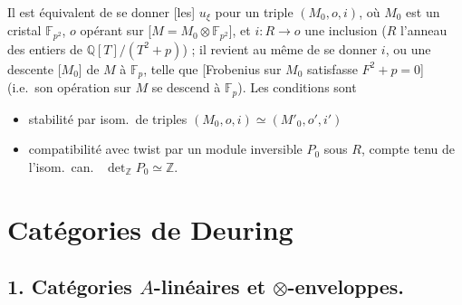 \documentclass[11pt,a4paper]{article}
\begin{document}
Il est équivalent de se donner [les] $u_{\xi}$ pour un triple
$(M_{0}, o, i)$, où  $M_{0}$ est un cristal
 $\mathbb{F}_{p^{2}}$, $o$  opérant sur
[$M = M_{0} \otimes \mathbb{F}_{p^{2}}$], et $i : R \to o$ une inclusion
($R$ l'anneau des entiers de $\mathbb{Q}[T]/(T^{2} + p)$) ; il revient au
même de se donner $i$, ou une descente [$M_{0}$] de $M$ à $\mathbb{F}_{p}$,
telle que [Frobenius sur $M_{0}$ satisfasse $F^{2} + p = 0$]
 (i.e.\ son opération sur $M$ se
descend à $\mathbb{F}_{p}$). Les conditions sont
\begin{itemize}
  \item[(i)] stabilité par isom.\ de triples
  $(M_{0}, o, i) \simeq (M'_{0}, o', i')$
  \item[(ii)]  compatibilité avec twist par un module
  inversible $P_{0}$ sous $R$, compte tenu de l'isom.\ can.~
  $\det_{\mathbb{Z}} P_{0} \simeq \mathbb{Z}$.
\end{itemize}

\section{Catégories de Deuring}


\subsection{1. Catégories $A$-linéaires et $\otimes$-enveloppes.}
\end{document}
